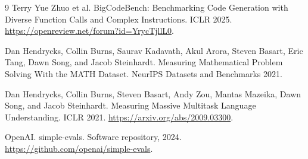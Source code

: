 \documentclass{article}
\begin{document}
\begin{thebibliography}{9}
Terry Yue Zhuo et al.
\newblock BigCodeBench: Benchmarking Code Generation with Diverse Function Calls and Complex Instructions.
\newblock ICLR 2025. \url{https://openreview.net/forum?id=YrycTjllL0}.

Dan Hendrycks, Collin Burns, Saurav Kadavath, Akul Arora, Steven Basart, Eric Tang, Dawn Song, and Jacob Steinhardt.
\newblock Measuring Mathematical Problem Solving With the MATH Dataset.
\newblock NeurIPS Datasets and Benchmarks 2021.

Dan Hendrycks, Collin Burns, Steven Basart, Andy Zou, Mantas Mazeika, Dawn Song, and Jacob Steinhardt.
\newblock Measuring Massive Multitask Language Understanding.
\newblock ICLR 2021. \url{https://arxiv.org/abs/2009.03300}.

OpenAI.
\newblock simple-evals.
\newblock Software repository, 2024. \url{https://github.com/openai/simple-evals}.

\end{thebibliography}
\end{document}
